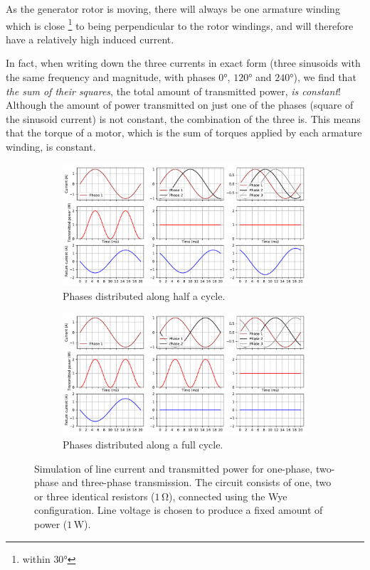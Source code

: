 \documentclass[main.tex]{subfiles}
\begin{document}
As the generator rotor is moving, there will always be one armature winding which is close \footnote{within $30 \si{\degree}$} to being perpendicular to the rotor windings, and will therefore have a relatively high induced current. 

In fact, when writing down the three currents in exact form (three sinusoids with the same frequency and magnitude, with phases $0\si{\degree}$, $120\si{\degree}$ and $240\si{\degree}$), we find that \emph{the sum of their squares}, \ie the total amount of transmitted power, \emph{is constant}! Although the amount of power transmitted on just one of the phases (square of the sinusoid current) is not constant, the combination of the three is. This means that the torque of a motor, which is the sum of torques applied by each armature winding, is constant.

\begin{figure}[ht]
\begin{subfigure}{\textwidth}
    \centering
    \includegraphics[width=\textwidth]{img/3phaseshalf.pdf}
    \caption{Phases distributed along half a cycle.}\label{fig:threephasehalfcycle}
\end{subfigure}
\begin{subfigure}{\textwidth}
    \centering
    \includegraphics[width=\textwidth]{img/3phasesfull.pdf}
    \caption{Phases distributed along a full cycle.}\label{fig:threephasefullcycle}
\end{subfigure}
    \caption{Simulation of line current and transmitted power for one-phase, two-phase and three-phase transmission. The circuit consists of one, two or three identical resistors ($1 \, \si{\ohm}$), connected using the Wye configuration. Line voltage is chosen to produce a fixed amount of power ($1 \, \si{\watt}$). }
\end{figure}
\end{document}
